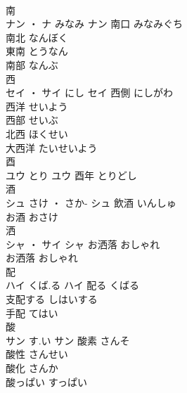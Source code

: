 \documentclass[8pt]{extreport}
\begin{document}
\begin{CJK}{UTF8}{min}
\\	南	
\\	ナン ・ ナ	みなみ	ナン	南口	みなみぐち	
\\	南北	なんぼく	
\\	東南	とうなん	
\\	南部	なんぶ	
\\	西	
\\	セイ ・ サイ	にし	セイ	西側	にしがわ	
\\	西洋	せいよう	
\\	西部	せいぶ	
\\	北西	ほくせい	
\\	大西洋	たいせいよう	
\\	酉	
\\	ユウ	とり	ユウ	酉年	とりどし	
\\	酒	
\\	シュ	さけ ・ さか-	シュ													飲酒	いんしゅ	
\\	お酒	おさけ	
\\	洒	
\\	シャ ・ サイ		シャ	お洒落	おしゃれ	
\\	お洒落	おしゃれ	
\\	配	
\\	ハイ	くば.る	ハイ	配る	くばる	
\\	支配する	しはいする	
\\	手配	てはい	
\\	酸	
\\	サン	す.い	サン	酸素	さんそ	
\\	酸性	さんせい	
\\	酸化	さんか	
\\	酸っぱい	すっぱい	
\end{CJK}
\end{document}
